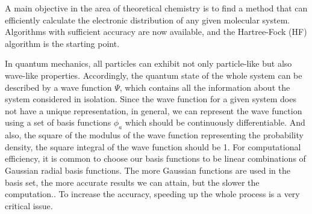 \documentclass[twoside,11pt]{article}
\begin{document}
A main objective in the area of theoretical chemistry is to find a method that can efficiently calculate the electronic distribution of any given molecular system. %
Algorithms with sufficient accuracy are now available, and the Hartree-Fock (HF) algorithm is the starting point.



In quantum mechanics, all particles can exhibit not only particle-like but also wave-like properties. Accordingly, the quantum state of the whole system can be described by a wave function $\Psi$, which contains all the information about the system considered in isolation. Since the wave function for a given system does not have a unique representation, in general, we can represent the wave function using a set of basis functions $\phi_a$ which should be continuously differentiable. And also, the square of the modulus of the wave function representing the probability density, the square integral of the wave function should be 1.
For computational efficiency, it is common to choose our basis functions to be linear combinations of Gaussian radial basis functions.
The more Gaussian functions are used in the basis set, the more accurate results we can attain, but the slower the computation.. To increase the accuracy, speeding up the whole process is a very critical issue. \\




\end{document}
